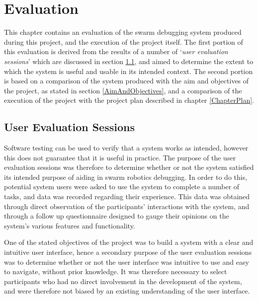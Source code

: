 
\chapter[Evaluation]{Evaluation} %

\label{ChapterEvaluation} %

This chapter contains an evaluation of the swarm debugging system produced during this project, and the execution of the project itself. The first portion of this evaluation is derived from the results of a number of `\textit{user evaluation sessions}' which are discussed in section \ref{UserEvaluationSessions}, and aimed to determine the extent to which the system is useful and usable in its intended context. The second portion is based on a comparison of the system produced with the aim and objectives of the project, as stated in section \ref{AimAndObjectives}, and a comparison of the execution of the project with the project plan described in chapter \ref{ChapterPlan}.


\section{User Evaluation Sessions} \label{UserEvaluationSessions}

Software testing can be used to verify that a system works as intended, however this does not guarantee that it is useful in practice. The purpose of the user evaluation sessions was therefore to determine whether or not the system satisfied its intended purpose of aiding in swarm robotics debugging. In order to do this, potential system users were asked to use the system to complete a number of tasks, and data was recorded regarding their experience. This data was obtained through direct observation of the participants' interactions with the system, and through a follow up questionnaire designed to gauge their opinions on the system's various features and functionality. 

One of the stated objectives of the project was to build a system with a clear and intuitive user interface, hence a secondary purpose of the user evaluation sessions was to determine whether or not the user interface was intuitive to use and easy to navigate, without prior knowledge. It was therefore necessary to select participants who had no direct involvement in the development of the system, and were therefore not biased by an existing understanding of the user interface.

